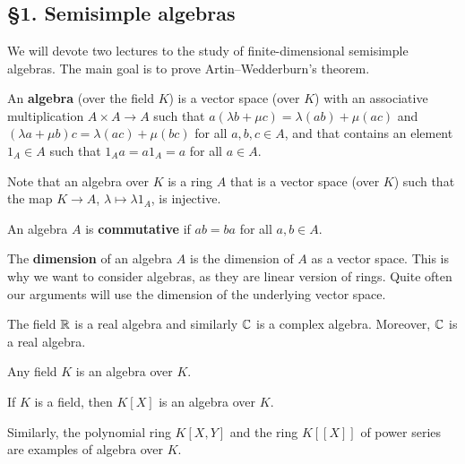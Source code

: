 \chapter{}

\section*{\S1. Semisimple algebras}

We will devote two lectures to the study of 
finite-dimensional semisimple algebras. The main goal is to
prove Artin--Wedderburn's theorem. 

\begin{definition}
	An \textbf{algebra} (over the field $K$) is a vector space (over $K$) 
	with an associative multiplication $A\times A\to A$ such that
	$a(\lambda b+\mu c)=\lambda(ab)+\mu(ac)$ and
	$(\lambda a+\mu b)c=\lambda(ac)+\mu (bc)$ for all $a,b,c\in A$, and 
	that contains an element $1_A\in A$ such that $1_Aa=a1_A=a$ for all $a\in A$.   
\end{definition}

Note that an algebra over $K$ is a ring $A$ that is a vector space
(over $K$) such that the map $K\to A$, $\lambda\mapsto \lambda1_A$, is injective. 

\begin{definition}
	An algebra $A$ is \textbf{commutative} if $ab=ba$ for all $a,b\in A$. 
\end{definition}

The \textbf{dimension} of an algebra $A$ is the dimension of $A$ as a vector space. This is why we want to consider algebras, as 
they are linear version of rings. Quite often our arguments will use the dimension of the underlying vector space.  

\begin{example}
	The field $\mathbb{R}$ is a real algebra and similarly 
	$\mathbb{C}$ is a complex algebra. Moreover, $\mathbb{C}$ is a real algebra. 
\end{example}

Any field $K$ is an algebra over $K$.

\begin{example}
	If $K$ is a field, then $K[X]$ is an algebra over $K$. 
\end{example}

Similarly, the polynomial ring $K[X,Y]$ and the ring $K[[X]]$ of power series
are examples of algebra over $K$. 

